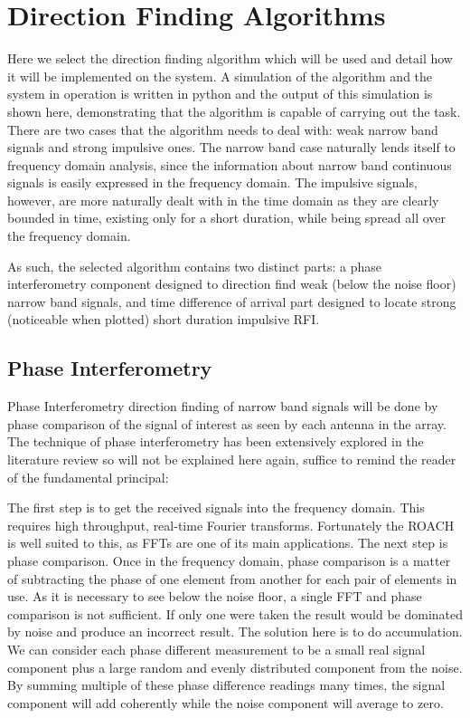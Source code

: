 \section{Direction Finding Algorithms}

Here we select the direction finding algorithm which will be used and detail how it will be implemented on the system. A simulation of the algorithm and the system in operation is written in python and the output of this simulation is shown here, demonstrating that the algorithm is capable of carrying out the task.
\\

There are two cases that the algorithm needs to deal with: weak narrow band signals and strong impulsive ones. The narrow band case naturally lends itself to frequency domain analysis, since the information about narrow band continuous signals is easily expressed in the frequency domain. The impulsive signals, however, are more naturally dealt with in the time domain as they are clearly bounded in time, existing only for a short duration, while being spread all over the frequency domain. 

As such, the selected algorithm contains two distinct parts: a phase interferometry component designed to direction find weak (below the noise floor) narrow band signals, and time difference of arrival part designed to locate strong (noticeable when plotted) short duration impulsive RFI.

\subsection{Phase Interferometry}
Phase Interferometry direction finding of narrow band signals will be done by phase comparison of the signal of interest as seen by each antenna in the array. The technique of phase interferometry has been extensively explored in the literature review so will not be explained here again, suffice to remind the reader of the fundamental principal: 

The first step is to get the received signals into the frequency domain. This requires high throughput, real-time Fourier transforms. Fortunately the ROACH is well suited to this, as FFTs are one of its main applications. The next step is phase comparison. Once in the frequency domain, phase comparison is a matter of subtracting the phase of one element from another for each pair of elements in use. As it is necessary to see below the noise floor, a single FFT and phase comparison is not sufficient. If only one were taken the result would be dominated by noise and produce an incorrect result. The solution here is to do accumulation. We can consider each phase different measurement to be a small real signal component plus a large random and evenly distributed component from the noise. By summing multiple of these phase difference readings many times, the signal component will add coherently while the noise component will average to zero. 

